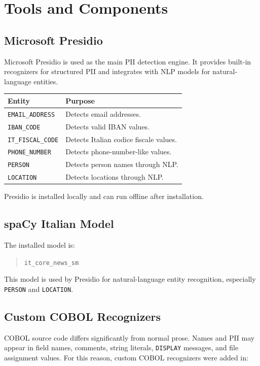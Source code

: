 ﻿\documentclass[11pt,a4paper]{article}
\newcommand{\code}[1]{\texttt{#1}}
\begin{document}
\section{Tools and Components}

\subsection{Microsoft Presidio}

Microsoft Presidio is used as the main PII detection engine. It provides built-in recognizers for structured PII and integrates with NLP models for natural-language entities.

\begin{longtable}{p{}p{}}
\textbf{Entity} & \textbf{Purpose} \\
\hline
\code{EMAIL\_ADDRESS} & Detects email addresses. \\
\code{IBAN\_CODE} & Detects valid IBAN values. \\
\code{IT\_FISCAL\_CODE} & Detects Italian codice fiscale values. \\
\code{PHONE\_NUMBER} & Detects phone-number-like values. \\
\code{PERSON} & Detects person names through NLP. \\
\code{LOCATION} & Detects locations through NLP. \\
\end{longtable}

Presidio is installed locally and can run offline after installation.

\subsection{spaCy Italian Model}

The installed model is:

\begin{quote}
\code{it\_core\_news\_sm}
\end{quote}

This model is used by Presidio for natural-language entity recognition, especially \code{PERSON} and \code{LOCATION}.

\subsection{Custom COBOL Recognizers}

COBOL source code differs significantly from normal prose. Names and PII may appear in field names, comments, string literals, \code{DISPLAY} messages, and file assignment values. For this reason, custom COBOL recognizers were added in:
\end{document}
